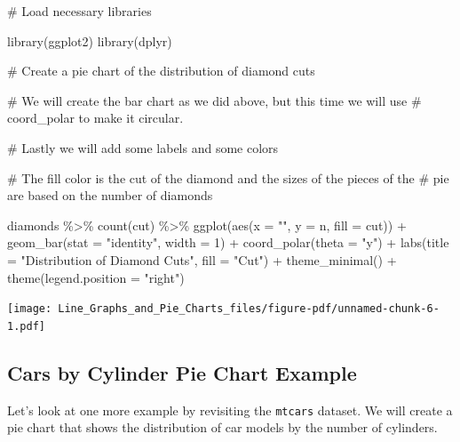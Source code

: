 \documentclass[
  letterpaper,
  DIV=11,
  numbers=noendperiod]{scrreprt}
\newenvironment{Shaded}{\begin{snugshade}}{\end{snugshade}}
\newcommand{\AttributeTok}[1]{\textcolor[rgb]{0.40,0.45,0.13}{#1}}
\newcommand{\CommentTok}[1]{\textcolor[rgb]{0.37,0.37,0.37}{#1}}
\newcommand{\DecValTok}[1]{\textcolor[rgb]{0.68,0.00,0.00}{#1}}
\newcommand{\FunctionTok}[1]{\textcolor[rgb]{0.28,0.35,0.67}{#1}}
\newcommand{\NormalTok}[1]{\textcolor[rgb]{0.00,0.23,0.31}{#1}}
\newcommand{\SpecialCharTok}[1]{\textcolor[rgb]{0.37,0.37,0.37}{#1}}
\newcommand{\StringTok}[1]{\textcolor[rgb]{0.13,0.47,0.30}{#1}}
\begin{document}
\begin{Shaded}
\begin{Highlighting}[]
\CommentTok{\# Load necessary libraries}

\FunctionTok{library}\NormalTok{(ggplot2)}
\FunctionTok{library}\NormalTok{(dplyr)}

\CommentTok{\# Create a pie chart of the distribution of diamond cuts}

\CommentTok{\# We will create the bar chart as we did above, but this time we will use}
\CommentTok{\# coord\_polar to make it circular.}

\CommentTok{\# Lastly we will add some labels and some colors}

\CommentTok{\# The fill color is the cut of the diamond and the sizes of the pieces of the }
\CommentTok{\# pie are based on the number of diamonds}

\NormalTok{diamonds }\SpecialCharTok{\%\textgreater{}\%}
  \FunctionTok{count}\NormalTok{(cut) }\SpecialCharTok{\%\textgreater{}\%}
  \FunctionTok{ggplot}\NormalTok{(}\FunctionTok{aes}\NormalTok{(}\AttributeTok{x =} \StringTok{""}\NormalTok{, }\AttributeTok{y =}\NormalTok{ n, }\AttributeTok{fill =}\NormalTok{ cut)) }\SpecialCharTok{+}
  \FunctionTok{geom\_bar}\NormalTok{(}\AttributeTok{stat =} \StringTok{"identity"}\NormalTok{, }\AttributeTok{width =} \DecValTok{1}\NormalTok{) }\SpecialCharTok{+}
  \FunctionTok{coord\_polar}\NormalTok{(}\AttributeTok{theta =} \StringTok{"y"}\NormalTok{) }\SpecialCharTok{+}
  \FunctionTok{labs}\NormalTok{(}\AttributeTok{title =} \StringTok{"Distribution of Diamond Cuts"}\NormalTok{,}
       \AttributeTok{fill =} \StringTok{"Cut"}\NormalTok{) }\SpecialCharTok{+}
  \FunctionTok{theme\_minimal}\NormalTok{() }\SpecialCharTok{+}
  \FunctionTok{theme}\NormalTok{(}\AttributeTok{legend.position =} \StringTok{"right"}\NormalTok{)}
\end{Highlighting}
\end{Shaded}

\texttt{[image: Line\_Graphs\_and\_Pie\_Charts\_files/figure-pdf/unnamed-chunk-6-1.pdf]}

\subsection*{Cars by Cylinder Pie Chart
Example}\label{cars-by-cylinder-pie-chart-example}

Let's look at one more example by revisiting the \texttt{mtcars}
dataset. We will create a pie chart that shows the distribution of car
models by the number of cylinders.
\end{document}
